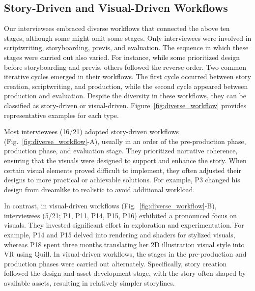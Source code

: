 \subsection{Story-Driven and Visual-Driven Workflows}
\label{sec:diverse_workflow}

Our interviewees embraced diverse workflows that connected the above ten stages, although some might omit some stages. Only  interviewees were involved in scriptwriting, storyboarding, previs, and evaluation. The sequence in which these stages were carried out also varied. For instance, while some prioritized design before storyboarding and previs, others followed the reverse order. Two common iterative cycles emerged in their workflows. The first cycle occurred between story creation, scriptwriting, and production, while the second cycle appeared between production and evaluation.
Despite the diversity in these workflows, they can be classified as story-driven or visual-driven. Figure~\ref{fig:diverse_workflow} provides representative examples for each type. 

Most interviewees (16/21) adopted story-driven workflows (Fig.~\ref{fig:diverse_workflow}-A), usually in an order of the pre-production phase, production phase, and evaluation stage. They prioritized narrative coherence, ensuring that the visuals were designed to support and enhance the story. When certain visual elements proved difficult to implement, they often adjusted their designs to more practical or achievable solutions. For example, P3 changed his design from dreamlike to realistic to avoid additional workload.

In contrast, in visual-driven workflows (Fig.~\ref{fig:diverse_workflow}-B), interviewees (5/21; P1, P11, P14, P15, P16) exhibited a pronounced focus on visuals. They invested significant effort in exploration and experimentation. For example, P14 and P15 delved into rendering and shaders for stylized visuals, whereas P18 spent three months translating her 2D illustration visual style into VR using Quill. In visual-driven workflows, the stages in the pre-production and production phases were carried out alternately. Specifically, story creation followed the design and asset development stage, with the story often shaped by available assets, resulting in relatively simpler storylines.
